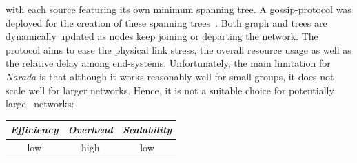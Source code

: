 with each source featuring its own minimum spanning tree.
A gossip-protocol was deployed for the creation of these 
spanning trees~\cite{LYL2008}.
Both graph and trees are dynamically updated as nodes keep joining 
or departing the network.
The protocol aims to ease the physical link stress, the overall
resource usage as well as the relative delay among end-systems. 
Unfortunately, the main limitation for {\sl Narada} is that 
although it works reasonably well for small groups, 
it does not scale well for larger networks. 
Hence, it is not a suitable choice for potentially large \p\ networks:
\begin{center}
{\footnotesize
\begin{tabular}{ccc}
\emph{Efficiency} & \emph{Overhead} & \emph{Scalability} \\
\hline
%
low &
high &
%
low
\end{tabular}
}
\end{center}


